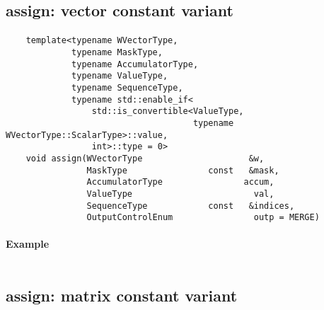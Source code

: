 \begin{verbatim}

\end{verbatim}


\subsection{{\sf assign}: vector constant variant}

\paragraph{\syntax}

\begin{verbatim}
    template<typename WVectorType,
             typename MaskType,
             typename AccumulatorType,
             typename ValueType,
             typename SequenceType,
             typename std::enable_if<
                 std::is_convertible<ValueType,
                                     typename WVectorType::ScalarType>::value,
                 int>::type = 0>
    void assign(WVectorType                     &w,
                MaskType                const   &mask,
                AccumulatorType                accum,
                ValueType                        val,
                SequenceType            const   &indices,
                OutputControlEnum                outp = MERGE)
\end{verbatim}


\paragraph{Example}

\begin{verbatim}

\end{verbatim}


\subsection{{\sf assign}: matrix constant variant}

\paragraph{\syntax}

